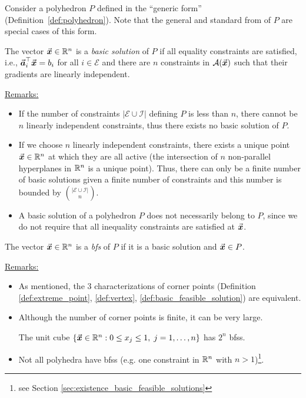 Consider a polyhedron \(P\) defined in the ``generic form'' (Definition~\ref{def:polyhedron}).
Note that the general and standard from of \(P\) are special cases of this form.
\begin{definition}\label{def:basic_solution}
The vector \(\vec{\boldsymbol{x}} \in \mathbb{R}^{n}\) is a \emph{basic solution} of \(P\) if all equality constraints are satisfied, i.e., \(\vec{\boldsymbol{a}}_i^\top \vec{\boldsymbol{x}} = b_i\) for all \(i \in \mathcal{E}\)
and
there are \(n\) constraints in \(\mathcal{A}(\vec{\boldsymbol{x}})\) such that their gradients are linearly independent.
\end{definition}
\underline{Remarks:}
\begin{itemize}
\item If the number of constraints \(|\mathcal{E} \cup \mathcal{I}|\) defining \(P\) is less than \(n\), there cannot be \(n\) linearly independent constraints, thus there exists no basic solution of \(P\).
\item If we choose \(n\) linearly independent constraints, there exists a unique point \(\vec{\boldsymbol{x}} \in \mathbb{R}^{n}\) at which they are all active (the intersection of \(n\) non-parallel hyperplanes in \(\mathbb{R}^{n}\) is a unique point).
      Thus, there can only be a finite number of basic solutions given a finite number of constraints and this number is bounded by \(\binom{|\mathcal{E} \cup \mathcal{I}|}{n}\). 
\item A basic solution of a polyhedron \(P\) does not necessarily belong to \(P\), since we do not require that all inequality constraints are satisfied at \(\vec{\boldsymbol{x}}\).
\end{itemize}
\begin{definition}\label{def:basic_feasible_solution}
The vector \(\vec{\boldsymbol{x}} \in \mathbb{R}^{n}\) is a \emph{\gls{bfs}} of \(P\) if it is a basic solution and \(\vec{\boldsymbol{x}} \in P\).
\end{definition}
\underline{Remarks:}
\begin{itemize}
  \item As mentioned, the 3 characterizations of corner points (Definition \ref{def:extreme_point}, \ref{def:vertex}, \ref{def:basic_feasible_solution}) are equivalent.
  \item Although the number of corner points is finite, it can be very large. \begin{example}\label{ex:unit_cube}
    The unit cube \(\{ \vec{\boldsymbol{x}} \in \mathbb{R}^{n} : 0 \leq x_j \leq 1, \; j = 1,\ldots,n \}\) has \(2^n\) \gls{bfs}s.
  \end{example}
  \item Not all polyhedra have \gls{bfs}s (e.g. one constraint in \(\mathbb{R}^{n}\) with \(n > 1\))\footnote{see Section \ref{sec:existence_basic_feasible_solutions}}.
\end{itemize}

